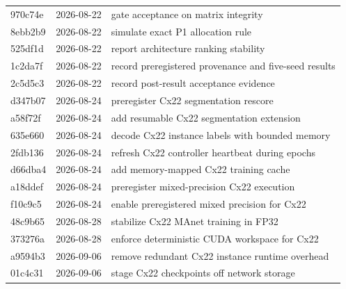 \begin{longtable}{p{1.5cm}p{2.0cm}p{11.5cm}}
970c74e & 2026-08-22 & gate acceptance on matrix integrity \\ 
8ebb2b9 & 2026-08-22 & simulate exact P1 allocation rule \\ 
525df1d & 2026-08-22 & report architecture ranking stability \\ 
1c2da7f & 2026-08-22 & record preregistered provenance and five-seed results \\ 
2c5d5c3 & 2026-08-22 & record post-result acceptance evidence \\ 
d347b07 & 2026-08-24 & preregister Cx22 segmentation rescore \\ 
a58f72f & 2026-08-24 & add resumable Cx22 segmentation extension \\ 
635e660 & 2026-08-24 & decode Cx22 instance labels with bounded memory \\ 
2fdb136 & 2026-08-24 & refresh Cx22 controller heartbeat during epochs \\ 
d66dba4 & 2026-08-24 & add memory-mapped Cx22 training cache \\ 
a18ddef & 2026-08-24 & preregister mixed-precision Cx22 execution \\ 
f10c9c5 & 2026-08-24 & enable preregistered mixed precision for Cx22 \\ 
48c9b65 & 2026-08-28 & stabilize Cx22 MAnet training in FP32 \\ 
373276a & 2026-08-28 & enforce deterministic CUDA workspace for Cx22 \\ 
a9594b3 & 2026-09-06 & remove redundant Cx22 instance runtime overhead \\ 
01c4c31 & 2026-09-06 & stage Cx22 checkpoints off network storage \\ 
\end{longtable}
